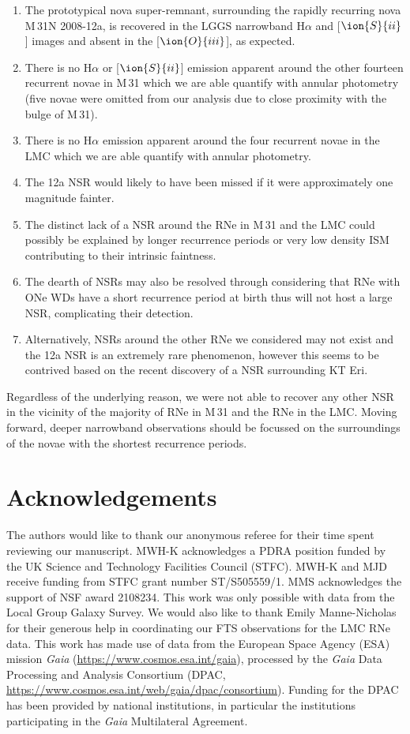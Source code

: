 \documentclass[fleqn,usenatbib]{mnras}
\begin{document}
\begin{enumerate}
\item The prototypical nova super-remnant, surrounding the rapidly recurring nova M\,31N 2008-12a, is recovered in the LGGS narrowband H$\alpha$ and [$\ion{S}{ii}$] images and absent in the [$\ion{O}{iii}$], as expected.
\item There is no H$\alpha$ or [$\ion{S}{ii}$] emission apparent around the other fourteen recurrent novae in M\,31 which we are able quantify with annular photometry (five novae were omitted from our analysis due to close proximity with the bulge of M\,31).
\item There is no H$\alpha$ emission apparent around the four recurrent novae in the LMC which we are able quantify with annular photometry.
\item The 12a NSR would likely to have been missed if it were approximately one magnitude fainter.
\item The distinct lack of a NSR around the RNe in M\,31 and the LMC could possibly be explained by longer recurrence periods or very low density ISM contributing to their intrinsic faintness.
\item The dearth of NSRs may also be resolved through considering that RNe with ONe WDs have a short recurrence period at birth thus will not host a large NSR, complicating their detection.
\item Alternatively, NSRs around the other RNe we considered may not exist and the 12a NSR is an extremely rare phenomenon, however this seems to be contrived based on the recent discovery of a NSR surrounding KT Eri.
\end{enumerate}

Regardless of the underlying reason, we were not able to recover any other NSR in the vicinity of the majority of RNe in M\,31 and the RNe in the LMC. Moving forward, deeper narrowband observations should be focussed on the surroundings of the novae with the shortest recurrence periods.

\section*{Acknowledgements}
The authors would like to thank our anonymous referee for their time spent reviewing our manuscript. MWH-K acknowledges a PDRA position funded by the UK Science and Technology Facilities Council (STFC). MWH-K and MJD receive funding from STFC grant number ST/S505559/1. MMS acknowledges the support of NSF award 2108234. This work was only possible with data from the Local Group Galaxy Survey. We would also like to thank Emily Manne-Nicholas for their generous help in coordinating our FTS observations for the LMC RNe data. This work has made use of data from the European Space Agency (ESA) mission {\it Gaia} (\url{https://www.cosmos.esa.int/gaia}), processed by the {\it Gaia} Data Processing and Analysis Consortium (DPAC, \url{https://www.cosmos.esa.int/web/gaia/dpac/consortium}). Funding for the DPAC has been provided by national institutions, in particular the institutions participating in the {\it Gaia} Multilateral Agreement. 
\end{document}
